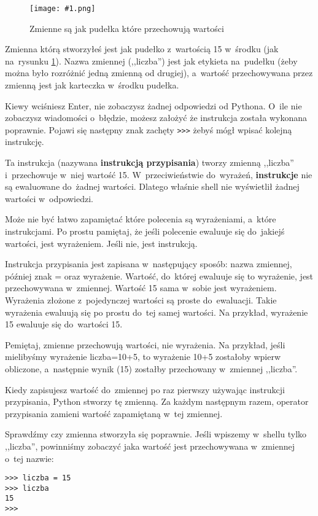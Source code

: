 \documentclass{book}
\newcommand{\img}[3]{
\begin{figure}
\centerline{
	\texttt{[image: \#1.png]}
}
\caption{#2}
\label{#1}
\end{figure}
}
\begin{document}
\img{idle-zmienna}{Zmienne są jak pudełka które przechowują wartości}{4 cm}

Zmienna którą stworzyłeś jest jak pudełko z~wartością 15 w~środku (jak na~rysunku \ref{idle-zmienna}). Nazwa zmiennej (,,liczba'') jest jak etykieta na~pudełku (żeby można było rozróżnić jedną zmienną od drugiej), a~wartość przechowywana przez zmienną jest jak karteczka w~środku pudełka.

Kiewy wciśniesz Enter, nie zobaczysz żadnej odpowiedzi od Pythona. O~ile nie zobaczysz wiadomości o~błędzie, możesz założyć że instrukcja została wykonana poprawnie. Pojawi się następny znak zachęty \lstinline{>>>} żebyś mógł wpisać kolejną instrukcję.

Ta instrukcja (nazywana {\bf instrukcją przypisania}) tworzy zmienną ,,liczba'' i~przechowuje w~niej wartość 15. W~przeciwieństwie do~wyrażeń, {\bf instrukcje} nie są ewaluowane do~żadnej wartości. Dlatego właśnie shell nie wyświetlił żadnej wartości w~odpowiedzi.

Może nie być łatwo zapamiętać które polecenia są wyrażeniami, a~które instrukcjami. Po prostu pamiętaj, że jeśli polecenie ewaluuje się do~jakiejś wartości, jest wyrażeniem. Jeśli nie, jest instrukcją.

Instrukcja przypisania jest zapisana w~następujący sposób: nazwa zmiennej, później znak = oraz wyrażenie. Wartość, do~której ewaluuje się to wyrażenie, jest przechowywana w~zmiennej. Wartość 15 sama w~sobie jest wyrażeniem. Wyrażenia złożone z~pojedynczej wartości są proste do~ewaluacji. Takie wyrażenia ewaluują się po prostu do~tej samej wartości. Na przykład, wyrażenie 15 ewaluuje się do~wartości 15.

Pemiętaj, zmienne przechowują wartości, nie wyrażenia. Na przykład, jeśli mielibyśmy wyrażenie liczba=10+5, to wyrażenie 10+5 zostałoby wpierw obliczone, a~następnie wynik (15) zostałby przechowany w~zmiennej ,,liczba''.

Kiedy zapisujesz wartość do~zmiennej po raz pierwszy używając instrukcji przypisania, Python stworzy tę zmienną. Za każdym następnym razem, operator przypisania zamieni wartość zapamiętaną w~tej zmiennej.

Sprawdźmy czy zmienna stworzyła się poprawnie. Jeśli wpiszemy w~shellu tylko ,,liczba'', powinniśmy zobaczyć jaka wartość jest przechowywana w~zmiennej o~tej nazwie:

\begin{lstlisting}
>>> liczba = 15
>>> liczba
15
>>> 
\end{lstlisting}
\end{document}
